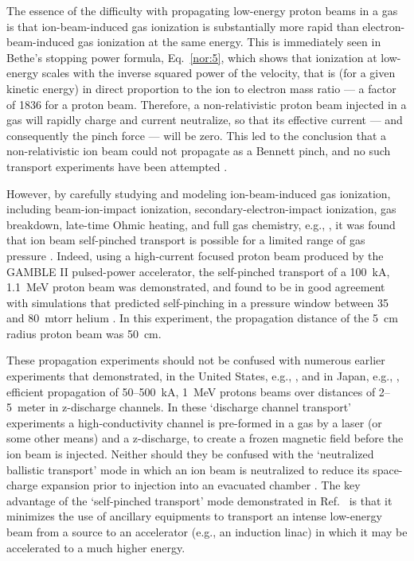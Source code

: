 \documentclass [12pt,a4paper,     ]{report} %
\begin{document}
   The essence of the difficulty with propagating low-energy proton beams in a gas is that ion-beam-induced gas ionization is substantially more rapid than electron-beam-induced gas ionization at the same energy.  This is immediately seen in Bethe's stopping power formula, Eq.~\eqref{nor:5}, which shows that ionization at low-energy scales with the inverse squared power of the velocity, that is (for a given kinetic energy) in direct proportion to the ion to electron mass ratio --- a factor of 1836 for a proton beam.  Therefore, a non-relativistic proton beam injected in a gas will rapidly charge and current neutralize, so that its effective current --- and consequently the pinch force --- will be zero.  This led to the conclusion that a non-relativistic ion beam could not propagate as a Bennett pinch, and no such transport experiments have been attempted \cite{ROSE-1999-}.

   However, by carefully studying and modeling ion-beam-induced gas ionization, including beam-ion-impact ionization,  secondary-electron-impact ionization, gas breakdown, late-time Ohmic heating, and full gas chemistry, e.g., \cite{YOUNG1994-, WELCH1996-}, it was found that ion beam self-pinched transport is possible for a limited range of gas pressure \cite{OLIVE1999-}.  Indeed, using a high-current focused proton beam produced by the GAMBLE II pulsed-power accelerator,  the self-pinched transport of a 100~kA, 1.1~MeV proton beam was demonstrated, and found to be in good agreement with simulations that predicted self-pinching in a pressure window between 35 and 80~mtorr helium \cite{OTTIN2000-}.  In this experiment, the propagation distance of the 5~cm radius proton beam was 50~cm.

   These propagation experiments should not be confused with numerous earlier experiments that demonstrated, in the United States, e.g., \cite{OLSEN1982-,NERI-1993-},  and in Japan, e.g., \cite{OZAKI1985-}, efficient propagation of 50--500~kA, 1~MeV protons beams over distances of 2--5~meter in z-discharge channels.  In these `discharge channel transport' experiments a high-conductivity channel is pre-formed in a gas by a laser (or some other means) and a z-discharge, to create a frozen magnetic field before the ion beam is injected.  Neither should they be confused with the `neutralized ballistic transport' mode in which an ion beam is neutralized to reduce its space-charge expansion prior to injection into an evacuated chamber \cite{ROY--2004-}.  The key advantage of the `self-pinched transport' mode demonstrated in Ref.~\cite{OTTIN2000-} is that it minimizes the use of ancillary equipments to transport an intense low-energy beam from a source to an accelerator (e.g., an induction linac) in which it may be accelerated to a much higher energy.
\end{document}
